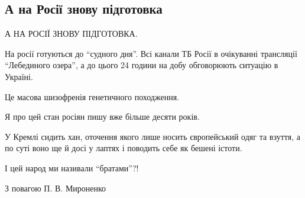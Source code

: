  
 
 
 
 

\subsection{А на Росії знову підготовка}

А НА РОСІЇ ЗНОВУ ПІДГОТОВКА.

На росії готуються до \enquote{судного дня}. Всі канали ТБ Росії в очікуванні
трансляції \enquote{Лебединого озера}, а до цього 24 години на добу обговорюють
ситуацію в Україні.

Це масова шизофренія генетичного походження. 

Я про цей стан росіян пишу вже більше десяти років. 

У Кремлі сидить хан, оточення якого лише носить європейський одяг та взуття, а
по суті воно ще й досі у лаптях і поводить себе як бешені істоти.

І цей народ ми називали \enquote{братами}?!

З повагою П. В. Мироненко
